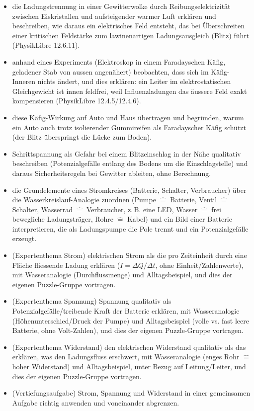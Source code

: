\documentclass[11pt,a4paper]{article}
\begin{document}
\begin{itemize}[leftmargin=1.3cm,itemsep=0.3em]
  \item[LZ1] die Ladungstrennung in einer Gewitterwolke durch
  Reibungselektrizität zwischen Eiskristallen und aufsteigender warmer Luft
  erklären und beschreiben, wie daraus ein elektrisches Feld entsteht, das
  bei Überschreiten einer kritischen Feldstärke zum lawinenartigen
  Ladungsausgleich (Blitz) führt (PhysikLibre 12.6.11).
  \item[LZ2] anhand eines Experiments (Elektroskop in einem Faradayschen
  Käfig, geladener Stab von aussen angenähert) beobachten, dass sich im
  Käfig-Inneren nichts ändert, und dies erklären: ein Leiter im
  elektrostatischen Gleichgewicht ist innen feldfrei, weil Influenzladungen
  das äussere Feld exakt kompensieren (PhysikLibre 12.4.5/12.4.6).
  \item[LZ3] diese Käfig-Wirkung auf Auto und Haus übertragen und
  begründen, warum ein Auto auch trotz isolierender Gummireifen als
  Faradayscher Käfig schützt (der Blitz überspringt die Lücke zum Boden).
  \item[LZ4] Schrittspannung als Gefahr bei einem Blitzeinschlag in der
  Nähe qualitativ beschreiben (Potenzialgefälle entlang des Bodens um die
  Einschlagstelle) und daraus Sicherheitsregeln bei Gewitter ableiten, ohne
  Berechnung.
  \item[LZ5] die Grundelemente eines Stromkreises (Batterie, Schalter,
  Verbraucher) über die Wasserkreislauf-Analogie zuordnen (Pumpe
  $\hat=$ Batterie, Ventil $\hat=$ Schalter, Wasserrad $\hat=$ Verbraucher,
  z.\,B. eine LED, Wasser $\hat=$ frei bewegliche Ladungsträger, Rohre
  $\hat=$ Kabel) und ein Bild einer Batterie interpretieren, die als
  Ladungspumpe die Pole trennt und ein Potenzialgefälle erzeugt.
  \item[LZ6] (Expertenthema Strom) elektrischen Strom als die pro
  Zeiteinheit durch eine Fläche fliessende Ladung erklären
  ($I=\Delta Q/\Delta t$, ohne Einheit/Zahlenwerte), mit
  Wasseranalogie (Durchflussmenge) und Alltagsbeispiel, und dies der
  eigenen Puzzle-Gruppe vortragen.
  \item[LZ7] (Expertenthema Spannung) Spannung qualitativ als
  Potenzialgefälle/treibende Kraft der Batterie erklären, mit
  Wasseranalogie (Höhenunterschied/Druck der Pumpe) und Alltagsbeispiel
  (volle vs. fast leere Batterie, ohne Volt-Zahlen), und dies der
  eigenen Puzzle-Gruppe vortragen.
  \item[LZ8] (Expertenthema Widerstand) den elektrischen Widerstand
  qualitativ als das erklären, was den Ladungsfluss erschwert, mit
  Wasseranalogie (enges Rohr $\hat=$ hoher Widerstand) und
  Alltagsbeispiel, unter Bezug auf Leitung/Leiter, und dies der eigenen
  Puzzle-Gruppe vortragen.
  \item[LZ9] (Vertiefungsaufgabe) Strom, Spannung und Widerstand in
  einer gemeinsamen Aufgabe richtig anwenden und voneinander abgrenzen.
\end{itemize}
\end{document}
